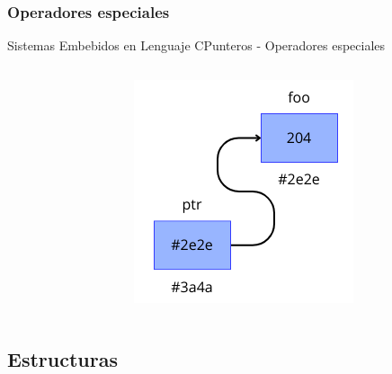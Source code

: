 \documentclass[aspectratio=169, xcolor=dvipsnames]{beamer}
\begin{document}
\subsubsection{Operadores especiales}
\begin{frame}{Sistemas Embebidos en Lenguaje C}{Punteros - Operadores especiales}
\begin{columns}
    \begin{column}{0.5\textwidth}
    
    \end{column}
    \begin{column}{0.5\textwidth}
    \begin{figure}
        \centering
        \includegraphics[width=0.75\linewidth]{resources/images/punteros.png}
    \end{figure}
    \end{column}
\end{columns}
\end{frame}

\subsection{Estructuras}
\end{document}
